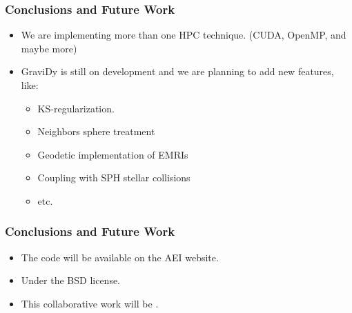 \begin{frame}
    \frametitle{Conclusions and Future Work}
    \begin{itemize}
        \item We are implementing more than one HPC technique.
            (CUDA, OpenMP, and maybe more)
        \item GraviDy is still on development and we are planning
            to add new features, like:
        \begin{itemize}
            \item KS-regularization.
            \item Neighbors sphere treatment
            \item Geodetic implementation of EMRIs
            \item Coupling with SPH stellar collisions
            \item etc.
        \end{itemize}
    \end{itemize}
\end{frame}

\begin{frame}
    \frametitle{Conclusions and Future Work}
    \begin{itemize}
        \item The code will be available on the AEI website.
        \item Under the BSD license.
        \item This collaborative work will be .
    \end{itemize}
\end{frame}
